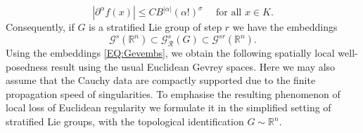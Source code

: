 \documentclass[12pt,oneside,a4paper]{book}
\numberwithin{equation}{section}     %
\theoremstyle{plain}
\theoremstyle{definition}
\newcommand{\R}{{\mathbb R}}
\newcommand{\Rn}{{\R}^n}
\begin{document}
\begin{equation}\label{gevreyRn}
|\partial^\alpha f(x)|\leq C B^{|\alpha|}(\alpha!)^\sigma \quad\textrm{ for all } x\in K.
\end{equation}
Consequently, if $G$ is a stratified Lie group of step $r$ we have the embeddings
\begin{equation}\label{EQ:Gevembs}
\mathcal G^{s}(\Rn)\subset \mathcal G^s_{\mathcal R}(G)\subset \mathcal G^{s r}(\Rn).
\end{equation} 
Using the embeddings \eqref{EQ:Gevembs}, we obtain the following spatially local well-posedness result using the usual Euclidean Gevrey spaces. Here we may also assume that the Cauchy data are compactly supported due to the finite propagation speed of singularities. To emphasise the resulting phenomenon of local loss of Euclidean regularity we formulate it in the simplified setting of stratified Lie groups, with the topological identification $G\sim\Rn$.
\end{document}
